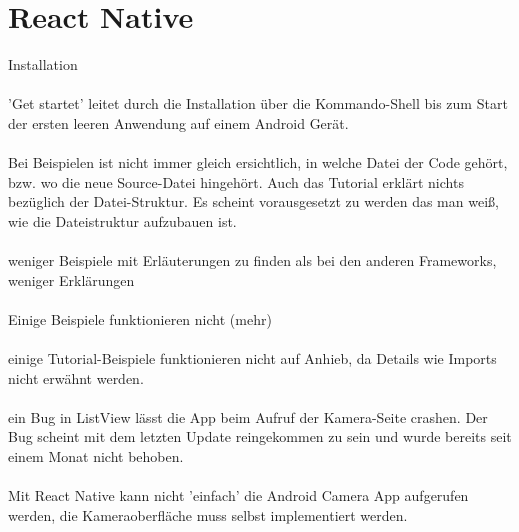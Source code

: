 \section{React Native}

Installation
\\
\\
'Get startet' leitet durch die Installation über die Kommando-Shell bis zum Start der ersten leeren Anwendung auf einem Android Gerät.
\\
\\
Bei Beispielen ist nicht immer gleich ersichtlich, in welche Datei der Code gehört, bzw. wo die neue Source-Datei hingehört. Auch das Tutorial erklärt nichts bezüglich der Datei-Struktur. Es scheint vorausgesetzt zu werden das man weiß, wie die Dateistruktur aufzubauen ist. 
\\
\\
weniger Beispiele mit Erläuterungen zu finden als bei den anderen Frameworks, weniger Erklärungen
\\
\\
Einige Beispiele funktionieren nicht (mehr)
\\
\\
einige Tutorial-Beispiele funktionieren nicht auf Anhieb, da Details wie Imports nicht erwähnt werden.
\\
\\
ein Bug in ListView lässt die App beim Aufruf der Kamera-Seite crashen. Der Bug scheint mit dem letzten Update reingekommen zu sein und wurde bereits seit einem Monat nicht behoben. 
\\
\\
Mit React Native kann nicht 'einfach' die Android Camera App aufgerufen werden, die Kameraoberfläche muss selbst implementiert werden.